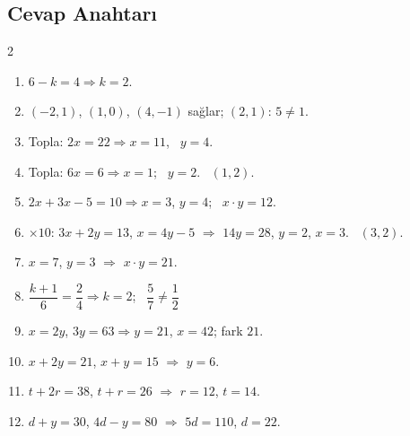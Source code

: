\subsection*{Cevap Anahtarı}
{\small
\begin{multicols}{2}
\begin{enumerate}[label=\textbf{\arabic*.},leftmargin=*,itemsep=1pt]
\item \(6-k=4\Rightarrow k=2\).
\item \((-2,1)\), \((1,0)\), \((4,-1)\) sağlar; \((2,1)\): \(5\neq 1\).
\item Topla: \(2x=22\Rightarrow x=11\), \ \(y=4\).
\item Topla: \(6x=6\Rightarrow x=1\); \ \(y=2\). \ \((1,2)\).
\item \(2x+3x-5=10\Rightarrow x=3\), \(y=4\); \ \(x\cdot y=12\).
\item \(\times 10\): \(3x+2y=13\), \(x=4y-5\) \(\Rightarrow\) \(14y=28\), \(y=2\), \(x=3\). \ \((3,2)\).
\item \(x=7\), \(y=3\) \(\Rightarrow\) \(x\cdot y=21\).
\item \(\dfrac{k+1}{6}=\dfrac24\Rightarrow k=2\); \ \(\dfrac57\neq\dfrac12\) \checkmark
\item \(x=2y\), \(3y=63\Rightarrow y=21\), \(x=42\); fark \(21\).
\item \(x+2y=21\), \(x+y=15\) \(\Rightarrow\) \(y=6\).
\item \(t+2r=38\), \(t+r=26\) \(\Rightarrow\) \(r=12\), \(t=14\).
\item \(d+y=30\), \(4d-y=80\) \(\Rightarrow\) \(5d=110\), \(d=22\).
\end{enumerate}
\end{multicols}}
